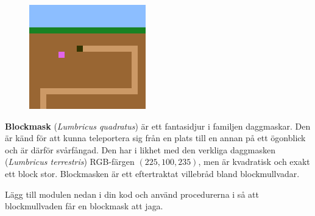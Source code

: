 {\raggedright
\begin{minipage}{0.27\textwidth}
\begin{figure}[H]%
  \includegraphics[width=\textwidth]{../img/blockworm.png}
  \label{lab:blockmole:fig:worm}
\end{figure}
\end{minipage}%
}%
\hfill\begin{minipage}{0.69\textwidth}
\noindent\textbf{Blockmask} (\textit{Lumbricus quadratus}) är ett fantasidjur i familjen daggmaskar. Den är känd för att kunna teleportera sig från en plats till en annan på ett ögonblick och är därför svårfångad. Den har i likhet med den verkliga daggmasken (\emph{Lumbricus terrestris}) RGB-färgen $(225, 100, 235)$, men är kvadratisk och exakt ett block stor. Blockmasken är ett eftertraktat villebråd bland blockmullvadar.

\end{minipage}



\Subtask Lägg till modulen  nedan i din kod och använd procedurerna i  så att blockmullvaden får en blockmask att jaga.


